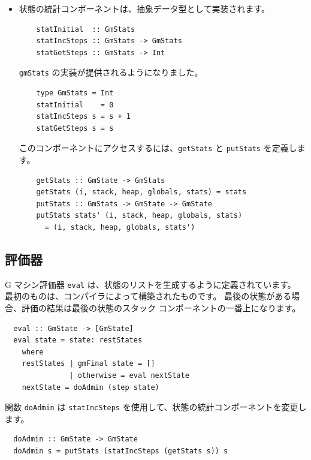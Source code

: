\documentclass{jbook}
\begin{document}
\begin{itemize}
	      \begin{verbatim}
    getGlobals :: GmState -> GmGlobals
    getGlobals (i, stack, heap, globals, stats) = globals
  \end{verbatim}

	\item 状態の統計コンポーネントは、抽象データ型として実装されます。

	      \begin{verbatim}
    statInitial  :: GmStats
    statIncSteps :: GmStats -> GmStats
    statGetSteps :: GmStats -> Int
  \end{verbatim}

	      \texttt{gmStats} の実装が提供されるようになりました。

	      \begin{verbatim}
    type GmStats = Int
    statInitial    = 0
    statIncSteps s = s + 1
    statGetSteps s = s
  \end{verbatim}

	      このコンポーネントにアクセスするには、\texttt{getStats} と \texttt{putStats} を定義します。

	      \begin{verbatim}
    getStats :: GmState -> GmStats
    getStats (i, stack, heap, globals, stats) = stats
    putStats :: GmStats -> GmState -> GmState
    putStats stats' (i, stack, heap, globals, stats)
      = (i, stack, heap, globals, stats')
  \end{verbatim}
\end{itemize}

\subsection{評価器}

G マシン評価器 \texttt{eval} は、状態のリストを生成するように定義されています。
最初のものは、コンパイラによって構築されたものです。
最後の状態がある場合、評価の結果は最後の状態のスタック コンポーネントの一番上になります。

\begin{verbatim}
  eval :: GmState -> [GmState]
  eval state = state: restStates
    where
    restStates | gmFinal state = []
               | otherwise = eval nextState
    nextState = doAdmin (step state)
\end{verbatim}

関数 \texttt{doAdmin} は \texttt{statIncSteps} を使用して、状態の統計コンポーネントを変更します。

\begin{verbatim}
  doAdmin :: GmState -> GmState
  doAdmin s = putStats (statIncSteps (getStats s)) s
\end{verbatim}
\end{document}
